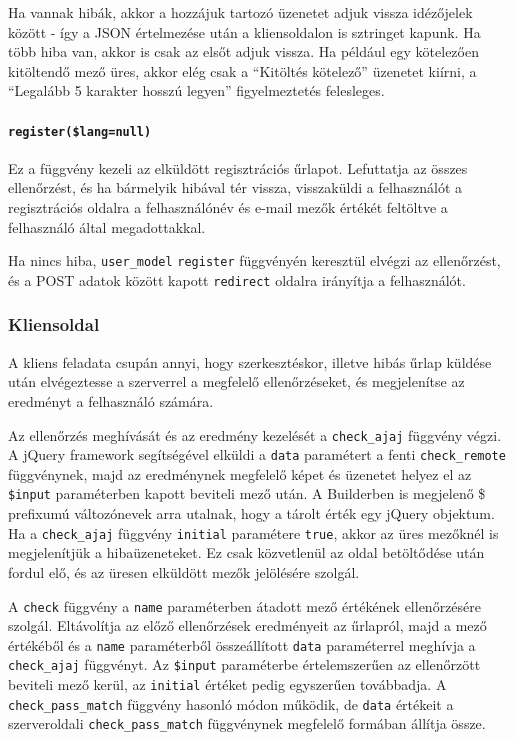\documentclass[12pt,a4paper,twoside]{article}
\begin{document}
Ha vannak hibák, akkor a hozzájuk tartozó üzenetet adjuk vissza idézőjelek
között - így a JSON értelmezése után a kliensoldalon is sztringet kapunk. Ha
több hiba van, akkor is csak az elsőt adjuk vissza. Ha például egy kötelezően
kitöltendő mező üres, akkor elég csak a ``Kitöltés kötelező'' üzenetet kiírni, a
``Legalább 5 karakter hosszú legyen'' figyelmeztetés felesleges.


\paragraph{\texttt{register(\$lang=null)}}
Ez a függvény kezeli az elküldött regisztrációs űrlapot. Lefuttatja az összes
ellenőrzést, és ha bármelyik hibával tér vissza, visszaküldi a felhasználót a
regisztrációs oldalra a felhasználónév és e-mail mezők értékét feltöltve a
felhasználó által megadottakkal.

Ha nincs hiba, \texttt{user\_model} \texttt{register} függvényén keresztül
elvégzi az ellenőrzést, és a POST adatok között kapott \texttt{redirect} oldalra
irányítja a felhasználót.


\subsubsection{Kliensoldal}

A kliens feladata csupán annyi, hogy szerkesztéskor, illetve hibás űrlap küldése
után elvégeztesse a szerverrel a megfelelő ellenőrzéseket, és megjelenítse az
eredményt a felhasználó számára.

Az ellenőrzés meghívását és az eredmény kezelését a \texttt{check\_ajaj}
függvény végzi. A jQuery framework segítségével elküldi a \texttt{data}
paramétert a fenti \texttt{check\_remote} függvénynek, majd az eredménynek
megfelelő képet és üzenetet helyez el az \texttt{\$input} paraméterben kapott
beviteli mező után. A Builderben is megjelenő \$ prefixumú változónevek arra
utalnak, hogy a tárolt érték egy jQuery objektum. Ha a \texttt{check\_ajaj}
függvény \texttt{initial} paramétere \texttt{true}, akkor az üres mezőknél is
megjelenítjük a hibaüzeneteket. Ez csak közvetlenül az oldal betöltődése után
fordul elő, és az üresen elküldött mezők jelölésére szolgál.

A \texttt{check} függvény a \texttt{name} paraméterben átadott mező értékének
ellenőrzésére szolgál. Eltávolítja az előző ellenőrzések eredményeit az
űrlapról, majd a mező értékéből és a \texttt{name} paraméterből összeállított
\texttt{data} paraméterrel meghívja a \texttt{check\_ajaj} függvényt. Az
\texttt{\$input} paraméterbe értelemszerűen az ellenőrzött beviteli mező kerül,
az \texttt{initial} értéket pedig egyszerűen továbbadja. A
\texttt{check\_pass\_match} függvény hasonló módon működik, de \texttt{data}
értékeit a szerveroldali \texttt{check\_pass\_match} függvénynek megfelelő
formában állítja össze.
\end{document}
